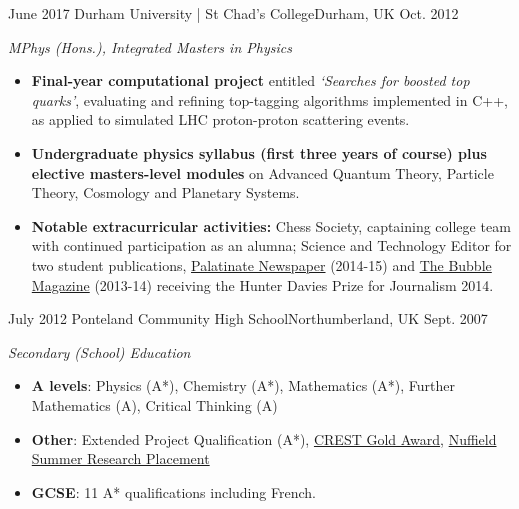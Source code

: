 \begin{educations}
\education
    {June 2017}   {Durham University | St Chad's College}{Durham, UK}{}
    {Oct. 2012} {\textit{MPhys (Hons.), Integrated Masters in Physics}
    \begin{itemize}
        \item \textbf{Final-year computational project} entitled \textit{`Searches for
boosted top quarks'}, evaluating and refining top-tagging algorithms implemented in C++, as applied to simulated LHC proton-proton scattering events.
        \item \textbf{Undergraduate physics syllabus (first three years of course) plus elective masters-level modules} on Advanced Quantum Theory, Particle Theory, Cosmology and Planetary Systems.
        \item \textbf{{Notable extracurricular activities:}} Chess Society, captaining college team with continued participation as an alumna; Science and Technology Editor for two student publications, \href{https://www.palatinate.org.uk/category/science-technology/}{Palatinate Newspaper} (2014-15) and \href{https://www.thebubble.org.uk/category/current-affairs/science-technology/}{The Bubble Magazine} (2013-14) receiving the Hunter Davies Prize for Journalism 2014.
    \end{itemize}
    }
    
 \emptySeparator
  \education
    {July 2012} {Ponteland Community High School}{Northumberland, UK}{}
    {Sept. 2007} {\textit{Secondary (School) Education}
    \begin{itemize}
        \item \textbf{A levels}: Physics (A*), Chemistry (A*), Mathematics (A*), Further Mathematics (A), Critical Thinking (A)
        \item \textbf{Other}: Extended Project Qualification (A*), \href{https://www.crestawards.org/crest-gold}{CREST Gold Award}, \href{https://www.nuffieldfoundation.org/students-teachers/nuffield-research-placements}{Nuffield Summer Research Placement}
        \item \textbf{GCSE}: 11 A* qualifications including French.
    \end{itemize}
    }
\end{educations}

\vspace{5mm}
